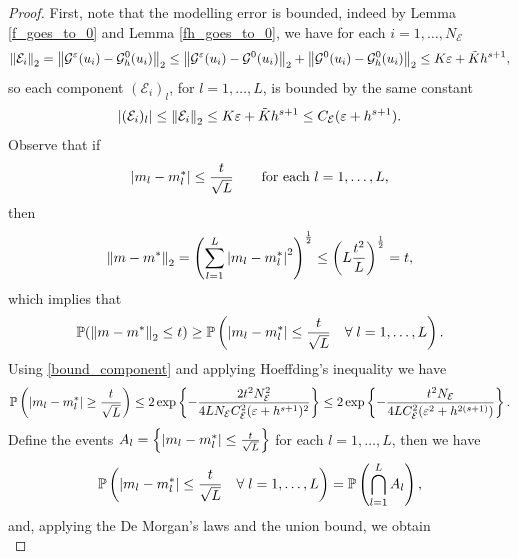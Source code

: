 \documentclass[10pt]{article}
\begin{document}
\begin{proof}
First, note that the modelling error is bounded, indeed by Lemma \ref{f_goes_to_0} and Lemma \ref{fh_goes_to_0}, we have for each $i = 1, \dots, N_{\mathcal{E}}$
\begin{equation*}
\left\|\mathcal{E}_i\right\|_2 = \left\|\mathcal{G}^{\varepsilon}(u_i) - \mathcal{G}^0_h(u_i)\right\|_2 \le \left\|\mathcal{G}^{\varepsilon}(u_i) - \mathcal{G}^0(u_i)\right\|_2 + \left\|\mathcal{G}^0(u_i) - \mathcal{G}^0_h(u_i)\right\|_2 \le K \varepsilon + \tilde{K} h^{s+1},
\end{equation*}
so each component $(\mathcal{E}_i)_l$, for $l = 1, \dots, L$, is bounded by the same constant
\begin{equation}
\label{bound_component}
\left\lvert(\mathcal{E}_i)_l\right\rvert \le \left\|\mathcal{E}_i\right\|_2 \le K \varepsilon + \tilde{K} h^{s+1} \le C_{\mathcal{E}} ( \varepsilon + h^{s+1} ).
\end{equation}
Observe that if
\[ \left\lvert m_l - m^*_l\right\rvert \le \frac{t}{\sqrt{L}} \qquad \text{for each } l = 1, \dots, L, \]
then
\begin{equation*}
\left\|m - m^*\right\|_2 = \left ( \sum_{l=1}^L \left\lvert m_l - m^*_l\right\rvert^2 \right )^{\frac{1}{2}} \le \left ( L \frac{t^2}{L} \right )^{\frac{1}{2}} = t,
\end{equation*}
which implies that
\begin{equation}
\label{1toL}
\mathbb{P}( \left\|m - m^*\right\|_2 \le t ) \ge \mathbb{P} \left ( \left\lvert m_l - m^*_l\right\rvert \le \frac{t}{\sqrt{L}} \quad \forall \; l = 1, \dots, L \right ).
\end{equation}
Using \eqref{bound_component} and applying Hoeffding's inequality we have
\begin{equation}
\label{hoeffding}
\mathbb{P} \left ( \left\lvert m_l - m^*_l\right\rvert \ge \frac{t}{\sqrt{L}} \right ) \le 2 \exp \left \{ - \frac{2 t^2 N_{\mathcal{E}}^2}{4 L N_{\mathcal{E}} C_{\mathcal{E}}^2 (\varepsilon + h^{s+1})^2 } \right \} \le 2 \exp \left \{ - \frac{t^2 N_{\mathcal{E}}}{4 L C_{\mathcal{E}}^2 (\varepsilon^2 + h^{2(s+1)})} \right \}.
\end{equation}
Define the events $A_l = \left \{ \left\lvert m_l - m^*_l\right\rvert \le \frac{t}{\sqrt{L}} \right \}$ for each $l = 1, \dots, L$, then we have
\begin{equation*}
\mathbb{P} \left ( \left\lvert m_l - m^*_l\right\rvert \le \frac{t}{\sqrt{L}} \quad \forall \; l = 1, \dots, L \right ) = \mathbb{P} \left ( \bigcap_{l=1}^L A_l \right ),
\end{equation*}
and, applying the De Morgan's laws and the union bound, we obtain
\begin{equation}

\end{equation}
\end{proof}
\end{document}
